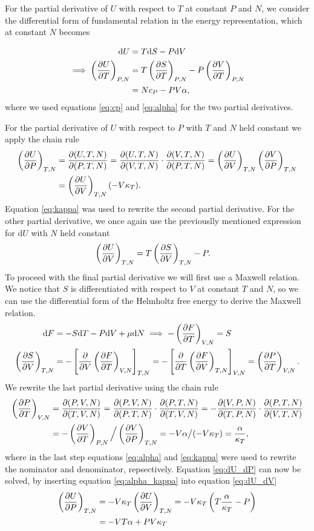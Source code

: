 \documentclass[reprint,english,notitlepage,aps,nobalancelastpage,nofootinbib]{revtex4-1}
\newcommand{\closed}[1]{\left(#1\right)}
\newcommand{\bracket}[1]{\left[#1\right]}
\newcommand{\kt}{\kappa_T}
\renewcommand{\cp}{c_P}
\renewcommand{\a}{\alpha}
\newcommand{\tmdv}[4]{\closed{\pdv{#1}{#2}}_{#3,#4}}
\newcommand{\jacobian}[2]{\pdv{(#1)}{(#2)}}
\renewcommand{\d}{\mathrm{d}}
\begin{document}
For the partial derivative of $U$ with respect to $T$ at constant $P$ and $N$, we consider the differential form of fundamental relation in the energy representation, which at constant $N$ becomes 

\begin{align}
	\d U &= T \d S - P \d V \nonumber \\ 
	\implies \tmdv{U}{T}{P}{N} &= T \tmdv{S}{T}{P}{N} - P \tmdv{V}{T}{P}{N} \nonumber \\ 
	&= N\cp - PV\a, \label{eq:dU_dT}
\end{align}
where we used equations \eqref{eq:cp} and \eqref{eq:alpha} for the two partial derivatives. 

For the partial derivative of $U$ with respect to $P$ with $T$ and $N$ held constant we apply the chain rule
\begin{align}
	\tmdv{U}{P}{T}{N} &= \jacobian{U,T,N}{P,T,N} = \jacobian{U,T,N}{V,T,N}\cdot \jacobian{V,T,N}{P,T,N} = \tmdv{U}{V}{T}{N} \tmdv{V}{P}{T}{N} \nonumber \\
	&= \tmdv{U}{V}{T}{N}(-V\kt). \label{eq:dU_dP}
\end{align}
Equation \eqref{eq:kappa} was used to rewrite the second partial derivative. For the other partial derivative, we once again use the previouslly mentioned expression for $\d U$ with $N$ held constant 
\begin{align} \label{eq:dU_dV}
	\tmdv{U}{V}{T}{N} &= T \tmdv{S}{V}{T}{N} - P.
\end{align}
To proceed with the final partial derivative we will first use a Maxwell relation. We notice that $S$ is differentiated with respect to $V$ at constant $T$ and $N$, so we can use the differential form of the Helmholtz free energy to derive the Maxwell relation. 
\begin{align*}
	\d F &= -S \d T -P \d V + \mu \d N \implies -\tmdv{F}{T}{V}{N} = S \\ 
	\tmdv{S}{V}{T}{N} &=-\bracket{\pdv{V}\tmdv{F}{T}{V}{N}}_{T,N} = -\bracket{\pdv{T}\tmdv{F}{V}{T}{N}}_{V,N} = \tmdv{P}{T}{V}{N}.
\end{align*} 
We rewrite the last partial derivative using the chain rule 
\begin{align}
	\tmdv{P}{T}{V}{N} &= \jacobian{P,V,N}{T,V,N} = \jacobian{P,V,N}{P,T,N}\cdot \jacobian{P,T,N}{T,V,N} = -\jacobian{V,P,N}{T,P,N}\cdot \jacobian{P,T,N}{V,T,N} \nonumber \\ 
	&= -\tmdv{V}{T}{P}{N} \Big/ \tmdv{V}{P}{T}{N} = -V\a \big/ (-V\kt) = \frac{\a}{\kt}, \label{eq:alpha_kappa}
\end{align} 
where in the last step equations \eqref{eq:alpha} and \eqref{eq:kappa} were used to rewrite the nominator and denominator, repsectively. Equation \eqref{eq:dU_dP} can now be solved, by inserting equation \eqref{eq:alpha_kappa} into equation \eqref{eq:dU_dV} 
\begin{align*}
	\tmdv{U}{P}{T}{N} &= -V\kt \tmdv{U}{V}{T}{N} = -V\kt \closed{T\frac{\a}{\kt} - P} \\ 
	&= -VT \a + PV\kt 
\end{align*}
\end{document}
